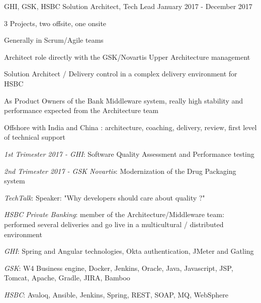 \begin{cventries}
        \cventry
        {} %
        {} %
        {} %
        {} %
        {
            \globalexperience
            {GHI, GSK, HSBC} %
            {Solution Architect, Tech Lead} %
            {January 2017 - December 2017} %
            {
                \begin{cvitems} %
                    \item{3 Projects, two offsite, one onsite}
                    \item{Generally in Scrum/Agile teams}
                    \item{Architect role directly with the GSK/Novartis Upper Architecture management}
                    \item{Solution Architect / Delivery control in a complex delivery environment for HSBC}
                    \item{As Product Owners of the Bank Middleware system, really high stability and performance expected from the Architecture team}
                    \item{Offshore with India and China : architecture, coaching, delivery, review, first level of technical support}
                \end{cvitems}
            }
            {
                \begin{cvitems} %
                \item{ \emph{1st Trimester 2017 - GHI}: Software Quality Assessment and Performance testing}
                \item{ \emph{2nd Trimester 2017 - GSK Novartis}: Modernization of the Drug Packaging system}
                \item{ \emph{TechTalk}: Speaker: "Why developers should care about quality ?"}
                \item{ \emph{HSBC Private Banking}: member of the Architecture/Middleware team: performed several deliveries and go live in a multicultural / distributed environment}
                \end{cvitems}
            }
            {
                \begin{cvitems} %
                    \item{\emph{GHI}: Spring and Angular technologies, Okta authentication, JMeter and Gatling}
                    \item{\emph{GSK}: W4 Business engine, Docker, Jenkins, Oracle, Java, Javascript, JSP, Tomcat, Apache, Gradle, JIRA, Bamboo}
                    \item{\emph{HSBC}: Avaloq, Ansible, Jenkins, Spring, REST, SOAP, MQ, WebSphere}
                \end{cvitems}
            }
        }


\end{cventries}
